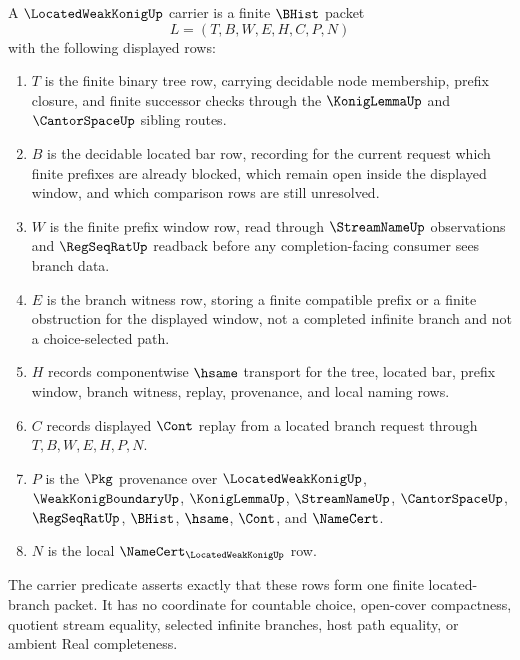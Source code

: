 \begin{definition}
\label{def:located-weak-konig-carrier}
A $\LocatedWeakKonigUp$ carrier is a finite $\BHist$ packet
$$
L=(T,B,W,E,H,C,P,N)
$$
with the following displayed rows:
\begin{enumerate}
\item $T$ is the finite binary tree row, carrying decidable node membership, prefix closure, and finite successor checks through the $\KonigLemmaUp$ and $\CantorSpaceUp$ sibling routes.
\item $B$ is the decidable located bar row, recording for the current request which finite prefixes are already blocked, which remain open inside the displayed window, and which comparison rows are still unresolved.
\item $W$ is the finite prefix window row, read through $\StreamNameUp$ observations and $\RegSeqRatUp$ readback before any completion-facing consumer sees branch data.
\item $E$ is the branch witness row, storing a finite compatible prefix or a finite obstruction for the displayed window, not a completed infinite branch and not a choice-selected path.
\item $H$ records componentwise $\hsame$ transport for the tree, located bar, prefix window, branch witness, replay, provenance, and local naming rows.
\item $C$ records displayed $\Cont$ replay from a located branch request through $T,B,W,E,H,P,N$.
\item $P$ is the $\Pkg$ provenance over $\LocatedWeakKonigUp$, $\WeakKonigBoundaryUp$, $\KonigLemmaUp$, $\StreamNameUp$, $\CantorSpaceUp$, $\RegSeqRatUp$, $\BHist$, $\hsame$, $\Cont$, and $\NameCert$.
\item $N$ is the local $\NameCert_{\LocatedWeakKonigUp}$ row.
\end{enumerate}
The carrier predicate asserts exactly that these rows form one finite located-branch packet. It has no coordinate for countable choice, open-cover compactness, quotient stream equality, selected infinite branches, host path equality, or ambient Real completeness.
\end{definition}

